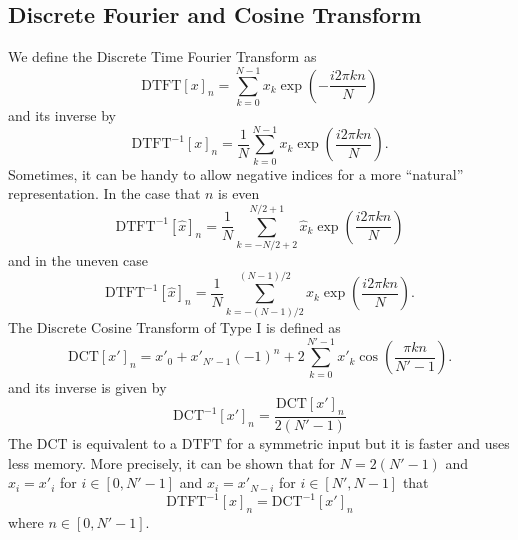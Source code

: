 \documentclass[18pt,a4paper]{extarticle}
\begin{document}
\subsection{Discrete Fourier and Cosine Transform}
We define the Discrete Time Fourier Transform as
\begin{equation}
\mathrm{DTFT}[x]_n = \sum^{N-1}_{k=0} x_k \exp\left(-\frac{i2\pi kn}{N}\right)
\end{equation}
and its inverse by
\begin{equation}
\mathrm{DTFT}^{-1}[x]_n = \frac{1}{N}\sum^{N-1}_{k=0} x_k \exp\left(\frac{i2\pi kn}{N}\right).
\end{equation}
Sometimes, it can be handy to allow negative indices for a more ``natural'' representation.
In the case that $n$ is even
\begin{equation}
\mathrm{DTFT}^{-1}[\hat{x}]_n = \frac{1}{N}\sum^{N/2+1}_{k=-N/2+2} \hat{x}_k \exp\left(\frac{i2\pi kn}{N}\right)
\end{equation}
and in the uneven case
\begin{equation}
\mathrm{DTFT}^{-1}[\hat{x}]_n = \frac{1}{N}\sum^{(N-1)/2}_{k=-(N-1)/2} \hat{x}_k \exp\left(\frac{i2\pi kn}{N}\right).
\end{equation}
The Discrete Cosine Transform of Type I is defined as
\begin{equation}
\mathrm{DCT}[x']_n = x'_0 + x'_{N'-1}(-1)^n + 2\sum_{k=0}^{N'-1} x'_k \cos \left(\frac{\pi k n}{N'-1}  \right).
\end{equation}
and its inverse is given by
\begin{equation}
\mathrm{DCT}^{-1}[x']_n = \frac{\mathrm{DCT}[x']_n}{2(N'-1)}
\end{equation}
The $\mathrm{DCT}$ is equivalent to a $\mathrm{DTFT}$ for a symmetric input but it is faster and uses less memory.
More precisely, it can be shown that for $N=2(N'-1)$ and $x_i=x'_i$ for $i\in[0, N'-1]$ and $x_i=x'_{N-i}$ for $i\in[N', N-1]$ that
\begin{equation}
\mathrm{DTFT}^{-1}[x]_n = \mathrm{DCT}^{-1}[x']_n 
\end{equation}
where $n\in[0, N'-1]$.
\end{document}
